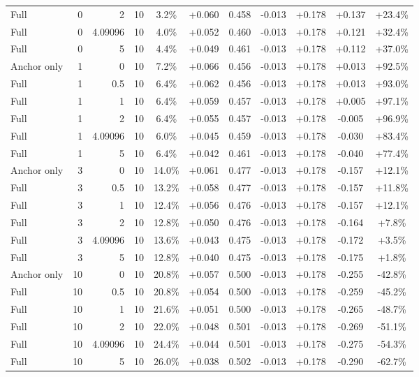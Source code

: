 \begin{table}[htbp]
\begin{tabular}{lrrrccccccc}
Full & 0 & 2 & 10 & 3.2\% & +0.060 & 0.458 & -0.013 & +0.178 & +0.137 & +23.4\% \\
Full & 0 & 4.09096 & 10 & 4.0\% & +0.052 & 0.460 & -0.013 & +0.178 & +0.121 & +32.4\% \\
Full & 0 & 5 & 10 & 4.4\% & +0.049 & 0.461 & -0.013 & +0.178 & +0.112 & +37.0\% \\
Anchor only & 1 & 0 & 10 & 7.2\% & +0.066 & 0.456 & -0.013 & +0.178 & +0.013 & +92.5\% \\
Full & 1 & 0.5 & 10 & 6.4\% & +0.062 & 0.456 & -0.013 & +0.178 & +0.013 & +93.0\% \\
Full & 1 & 1 & 10 & 6.4\% & +0.059 & 0.457 & -0.013 & +0.178 & +0.005 & +97.1\% \\
Full & 1 & 2 & 10 & 6.4\% & +0.055 & 0.457 & -0.013 & +0.178 & -0.005 & +96.9\% \\
Full & 1 & 4.09096 & 10 & 6.0\% & +0.045 & 0.459 & -0.013 & +0.178 & -0.030 & +83.4\% \\
Full & 1 & 5 & 10 & 6.4\% & +0.042 & 0.461 & -0.013 & +0.178 & -0.040 & +77.4\% \\
Anchor only & 3 & 0 & 10 & 14.0\% & +0.061 & 0.477 & -0.013 & +0.178 & -0.157 & +12.1\% \\
Full & 3 & 0.5 & 10 & 13.2\% & +0.058 & 0.477 & -0.013 & +0.178 & -0.157 & +11.8\% \\
Full & 3 & 1 & 10 & 12.4\% & +0.056 & 0.476 & -0.013 & +0.178 & -0.157 & +12.1\% \\
Full & 3 & 2 & 10 & 12.8\% & +0.050 & 0.476 & -0.013 & +0.178 & -0.164 & +7.8\% \\
Full & 3 & 4.09096 & 10 & 13.6\% & +0.043 & 0.475 & -0.013 & +0.178 & -0.172 & +3.5\% \\
Full & 3 & 5 & 10 & 12.8\% & +0.040 & 0.475 & -0.013 & +0.178 & -0.175 & +1.8\% \\
Anchor only & 10 & 0 & 10 & 20.8\% & +0.057 & 0.500 & -0.013 & +0.178 & -0.255 & -42.8\% \\
Full & 10 & 0.5 & 10 & 20.8\% & +0.054 & 0.500 & -0.013 & +0.178 & -0.259 & -45.2\% \\
Full & 10 & 1 & 10 & 21.6\% & +0.051 & 0.500 & -0.013 & +0.178 & -0.265 & -48.7\% \\
Full & 10 & 2 & 10 & 22.0\% & +0.048 & 0.501 & -0.013 & +0.178 & -0.269 & -51.1\% \\
Full & 10 & 4.09096 & 10 & 24.4\% & +0.044 & 0.501 & -0.013 & +0.178 & -0.275 & -54.3\% \\
Full & 10 & 5 & 10 & 26.0\% & +0.038 & 0.502 & -0.013 & +0.178 & -0.290 & -62.7\% \\

\end{tabular}
\end{table}
